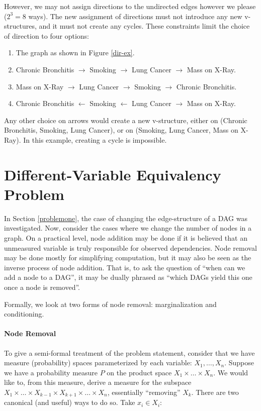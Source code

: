 \documentclass{article}
\newcommand{\problemtwo}{Different-Variable Equivalency Problem}
\begin{document}
	However, we may not assign directions to the undirected edges however we please ($2^3=8$ ways).
	The new assignment of directions must not introduce any new v-structures, and it must not create any cycles.
	These constraints limit the choice of direction to four options:
	\begin{enumerate}
		\item The graph as shown in Figure \ref{dir-ex}.
		\item Chronic Bronchitis $\rightarrow$ Smoking $\rightarrow$ Lung Cancer $\rightarrow$ Mass on X-Ray.
		\item Mass on X-Ray $\rightarrow$ Lung Cancer $\rightarrow$ Smoking $\rightarrow$ Chronic Bronchitis. \label{LCimpSmoking1}
		\item Chronic Bronchitis $\leftarrow$ Smoking $\leftarrow$ Lung Cancer $\rightarrow$ Mass on X-Ray. \label{LCimpSmoking2}
	\end{enumerate}
	Any other choice on arrows would create a new v-structure, either on (Chronic Bronchitis, Smoking, Lung Cancer), or on (Smoking, Lung Cancer, Mass on X-Ray). In this example, creating a cycle is impossible.
	
	\section{\problemtwo}
	\label{problemtwo}
	In Section \ref{problemone}, the case of changing the edge-structure of a DAG was investigated.
	Now, consider the cases where we change the number of nodes in a graph.
	On a practical level, node addition may be done if it is believed that an unmeasured variable is truly responsible for observed dependencies.
	Node removal may be done mostly for simplifying computation, but it may also be seen as the inverse process of node addition.
	That is, to ask the question of ``when can we add a node to a DAG'', it may be dually phrased as ``which DAGs yield this one once a node is removed''.
	
	Formally, we look at two forms of node removal: marginalization and conditioning.
	
	\paragraph{Node Removal}
	
	To give a semi-formal treatment of the problem statement, consider that we have measure (probability) spaces parameterized by each variable: $X_1, \dots, X_n$.
	Suppose we have a probability measure $P$ on the product space $X_1 \times \dots \times X_n$.
	We would like to, from this measure, derive a measure for the subspace $X_1 \times \dots \times X_{k-1} \times X_{k+1} \times \dots \times X_n$, essentially ``removing'' $X_k$.
	There are two canonical (and useful) ways to do so.
	Take $x_i \in X_i$:
	
\end{document}
